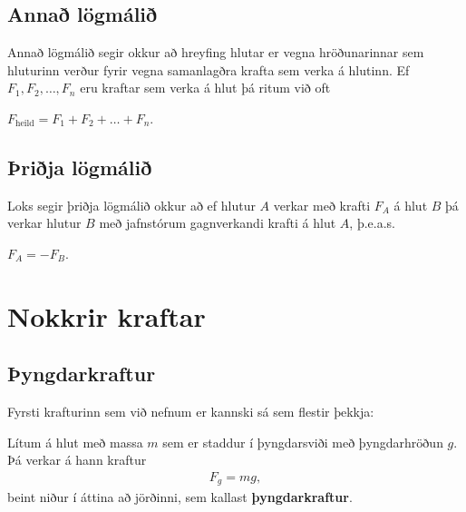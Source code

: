 \ifdefined \wholebook \else\documentclass[oneside]{book}\usepackage{EdlBook}\graphicspath{{figures/}}
\begin{document}
\subsection*{Annað lögmálið}

Annað lögmálið segir okkur að hreyfing hlutar er vegna hröðunarinnar sem hluturinn verður fyrir vegna samanlagðra krafta sem verka á hlutinn. Ef $F_1, F_2, \ldots, F_n$ eru kraftar sem verka á hlut þá ritum við oft
\begin{center}
\begin{tcbox}[nobeforeafter]{$F_{\text{heild}} = F_1 + F_2 + \ldots + F_n.$}
\end{tcbox}
\end{center}

\subsection*{Þriðja lögmálið}

Loks segir þriðja lögmálið okkur að ef hlutur $A$ verkar með krafti $F_A$ á hlut $B$ þá verkar hlutur $B$ með jafnstórum gagnverkandi krafti á hlut $A$, þ.e.a.s.
\begin{center}
\begin{tcbox}[nobeforeafter]{$F_A = -F_B.$}
\end{tcbox}
\end{center}

\section{Nokkrir kraftar}

\subsection*{Þyngdarkraftur}

Fyrsti krafturinn sem við nefnum er kannski sá sem flestir þekkja:

\begin{tcolorbox}
\begin{definition}
    Lítum á hlut með massa $m$ sem er staddur í þyngdarsviði með þyngdarhröðun $g$. Þá verkar á hann kraftur
    \begin{align*}
        F_g = mg,
    \end{align*}
    beint niður í áttina að jörðinni, sem kallast \textbf{þyngdarkraftur}.
\end{definition}
\end{tcolorbox}
\end{document}
